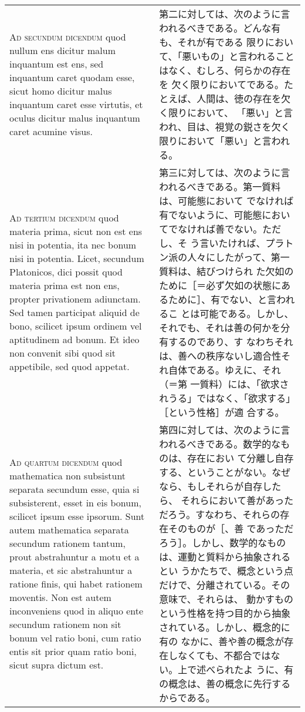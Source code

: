 \documentclass[10pt]{jsarticle} %
\begin{document}
\begin{longtable}{p{21em}p{21em}}
\\


{\scshape Ad secundum dicendum} quod nullum ens dicitur malum inquantum est
 ens, sed inquantum caret quodam esse, sicut homo dicitur malus
 inquantum caret esse virtutis, et oculus dicitur malus inquantum caret
 acumine visus.

&

第二に対しては、次のように言われるべきである。どんな有も、それが有である
 限りにおいて、「悪いもの」と言われることはなく、むしろ、何らかの存在を
 欠く限りにおいてである。たとえば、人間は、徳の存在を欠く限りにおいて、
 「悪い」と言われ、目は、視覚の鋭さを欠く限りにおいて「悪い」と言われる。

\\



{\scshape Ad tertium dicendum} quod materia prima, sicut non est ens nisi in
 potentia, ita nec bonum nisi in potentia. Licet, secundum Platonicos,
 dici possit quod materia prima est non ens, propter privationem
 adiunctam. Sed tamen participat aliquid de bono, scilicet ipsum ordinem
 vel aptitudinem ad bonum. Et ideo non convenit sibi quod sit
 appetibile, sed quod appetat.

&

第三に対しては、次のように言われるべきである。第一質料は、可能態において
 でなければ有でないように、可能態においてでなければ善でない。ただし、そ
 う言いたければ、プラトン派の人々にしたがって、第一質料は、結びつけられ
 た欠如のために［＝必ず欠如の状態にあるために］、有でない、と言われるこ
 とは可能である。しかし、それでも、それは善の何かを分有するのであり、す
 なわちそれは、善への秩序ないし適合性それ自体である。ゆえに、それ（＝第
 一質料）には、「欲求されうる」ではなく、「欲求する」［という性格］が適
 合する。


\\

{\scshape Ad quartum dicendum} quod mathematica non subsistunt separata
 secundum esse, quia si subsisterent, esset in eis bonum, scilicet ipsum
 esse ipsorum. Sunt autem mathematica separata secundum rationem tantum,
 prout abstrahuntur a motu et a materia, et sic abstrahuntur a ratione
 finis, qui habet rationem moventis. Non est autem inconveniens quod in
 aliquo ente secundum rationem non sit bonum vel ratio boni, cum ratio
 entis sit prior quam ratio boni, sicut supra dictum est.

&

第四に対しては、次のように言われるべきである。数学的なものは、存在におい
 て分離し自存する、ということがない。なぜなら、もしそれらが自存したら、
 それらにおいて善があっただろう。すなわち、それらの存在そのものが［、善
 であっただろう］。しかし、数学的なものは、運動と質料から抽象されるとい
 うかたちで、概念という点だけで、分離されている。その意味で、それらは、
 動かすものという性格を持つ目的から抽象されている。しかし、概念的に有の
 なかに、善や善の概念が存在しなくても、不都合ではない。上で述べられたよ
 うに、有の概念は、善の概念に先行するからである。

\end{longtable}
\end{document}
